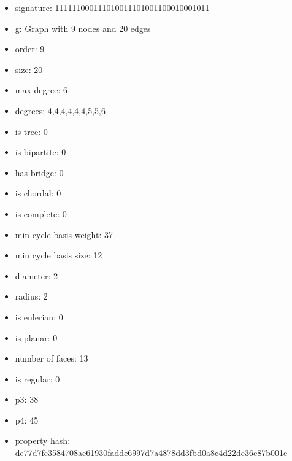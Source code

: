 \newpage
\begin{figure}
\end{figure}
\begin{itemize}
\item signature: 111111000111010011101001100010001011
\item g: Graph with 9 nodes and 20 edges
\item order: 9
\item size: 20
\item max degree: 6
\item degrees: 4,4,4,4,4,4,5,5,6
\item is tree: 0
\item is bipartite: 0
\item has bridge: 0
\item is chordal: 0
\item is complete: 0
\item min cycle basis weight: 37
\item min cycle basis size: 12
\item diameter: 2
\item radius: 2
\item is eulerian: 0
\item is planar: 0
\item number of faces: 13
\item is regular: 0
\item p3: 38
\item p4: 45
\item property hash: de77d7fe3584708ae61930fadde6997d7a4878dd3fbd0a8c4d22de36c87b001e
\end{itemize}
